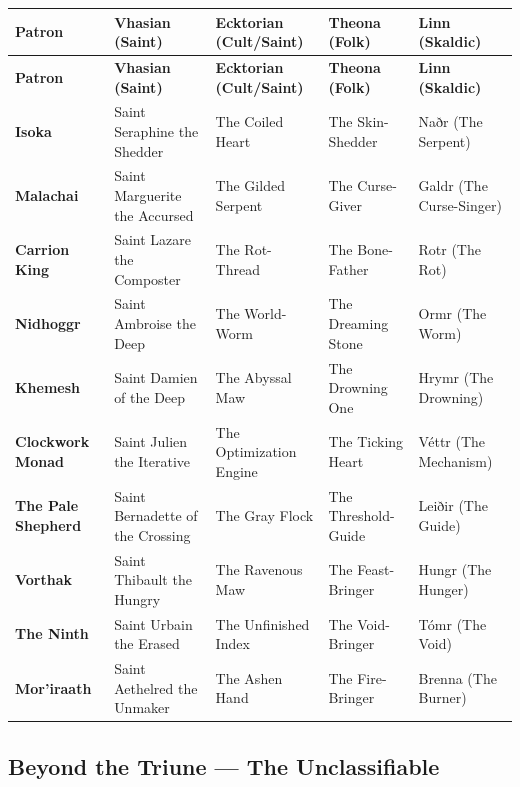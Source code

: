 \begin{longtable}{p{3cm}|p{2.8cm}|p{2.8cm}|p{2.8cm}|p{2.8cm}}
\toprule
\textbf{Patron} & \textbf{Vhasian (Saint)} & \textbf{Ecktorian (Cult/Saint)} & \textbf{Theona (Folk)} & \textbf{Linn (Skaldic)} \\
\midrule
\endfirsthead
\toprule
\textbf{Patron} & \textbf{Vhasian (Saint)} & \textbf{Ecktorian (Cult/Saint)} & \textbf{Theona (Folk)} & \textbf{Linn (Skaldic)} \\
\midrule
\endhead
\bottomrule
\endfoot
\textbf{Isoka} & Saint Seraphine the Shedder & The Coiled Heart & The Skin-Shedder & Naðr (The Serpent) \\
\textbf{Malachai} & Saint Marguerite the Accursed & The Gilded Serpent & The Curse-Giver & Galdr (The Curse-Singer) \\
\textbf{Carrion King} & Saint Lazare the Composter & The Rot-Thread & The Bone-Father & Rotr (The Rot) \\
\textbf{Nidhoggr} & Saint Ambroise the Deep & The World-Worm & The Dreaming Stone & Ormr (The Worm) \\
\textbf{Khemesh} & Saint Damien of the Deep & The Abyssal Maw & The Drowning One & Hrymr (The Drowning) \\
\textbf{Clockwork Monad} & Saint Julien the Iterative & The Optimization Engine & The Ticking Heart & Véttr (The Mechanism) \\
\textbf{The Pale Shepherd} & Saint Bernadette of the Crossing & The Gray Flock & The Threshold-Guide & Leiðir (The Guide) \\
\textbf{Vorthak} & Saint Thibault the Hungry & The Ravenous Maw & The Feast-Bringer & Hungr (The Hunger) \\
\textbf{The Ninth} & Saint Urbain the Erased & The Unfinished Index & The Void-Bringer & Tómr (The Void) \\
\textbf{Mor'iraath} & Saint Aethelred the Unmaker & The Ashen Hand & The Fire-Bringer & Brenna (The Burner) \\
\bottomrule
\end{longtable}

\subsection{Beyond the Triune --- The Unclassifiable}

